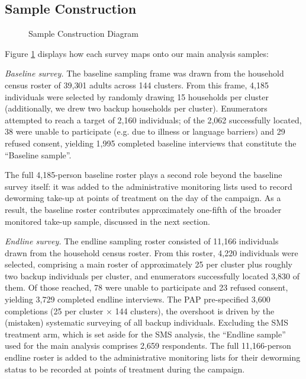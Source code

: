 
\subsection{Sample Construction}
\label{app:sample-construction}
\begin{landscape}
    \begin{figure}
      \centering                                                   
      \caption{Sample Construction Diagram}    
      \label{fig:sample-consort}
    \end{figure}  
  \end{landscape}


\clearpage
\newpage

Figure \ref{fig:sample-consort} displays how each survey maps onto our main analysis samples:

\emph{Baseline survey.} The baseline sampling frame was drawn from the household
census roster of 39{,}301 adults across 144 clusters.  From this frame, 4{,}185
individuals were selected by randomly drawing 15 households per cluster (additionally, we drew two backup 
households per cluster).  Enumerators attempted to reach a
target of 2{,}160 individuals; of the 2{,}062 successfully located, 38 were
unable to participate (e.g. due to illness or language barriers) and 29
refused consent, yielding 1{,}995 completed baseline interviews that
constitute the ``Baseline sample''.

The full 4{,}185-person baseline roster plays a second role beyond the baseline
survey itself: it was added to the administrative monitoring lists used to
record deworming take-up at points of treatment on the day of the campaign.  As
a result, the baseline roster contributes approximately one-fifth of the broader
monitored take-up sample, discussed in the next section.


\emph{Endline survey.} The endline sampling roster consisted of 11{,}166
individuals drawn from the household census roster.  From this roster, 4{,}220
individuals were selected, comprising a main roster of approximately 25 per
cluster plus roughly two backup individuals per cluster, and enumerators
successfully located 3{,}830 of them.  Of those reached, 78 were unable to
participate and 23 refused consent, yielding 3{,}729 completed endline
interviews.  The PAP pre-specified 3{,}600 completions (25 per cluster $\times$
144 clusters), the overshoot is driven by the (mistaken) systematic surveying of
all backup individuals. Excluding the SMS treatment arm, which is set aside for
the SMS analysis, the ``Endline sample'' used for the main analysis comprises
2{,}659 respondents.  The full 11{,}166-person endline roster is added to the
administrative monitoring lists for their deworming status to be recorded at
points of treatment during the campaign.


